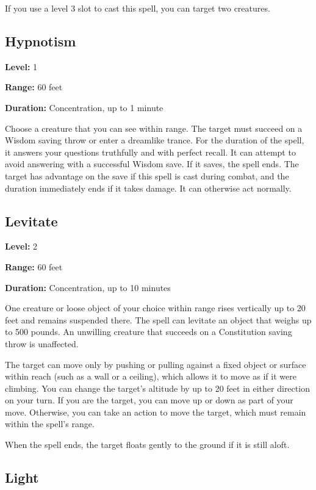 \documentclass[12pt,letterpaper,twocolumn,openany,nodeprecatedcode,bg=none]{dndbook}
\let\oldsubsection\subsection
\renewcommand{\subsection}[1]{%
  \needspace{5\baselineskip}%
  \oldsubsection{#1}%
}
\begin{document}
If you use a level 3 slot to cast this spell, you can target two
creatures.

\subsection{Hypnotism}\label{hypnotism}

\textbf{Level:} 1

\textbf{Range:} 60 feet

\textbf{Duration:} Concentration, up to 1 minute

Choose a creature that you can see within range. The target must succeed
on a Wisdom saving throw or enter a dreamlike trance. For the duration
of the spell, it answers your questions truthfully and with perfect
recall. It can attempt to avoid answering with a successful Wisdom save.
If it saves, the spell ends. The target has advantage on the save if
this spell is cast during combat, and the duration immediately ends if
it takes damage. It can otherwise act normally.

\newpage

\subsection{Levitate}\label{levitate}

\textbf{Level:} 2

\textbf{Range:} 60 feet

\textbf{Duration:} Concentration, up to 10 minutes

One creature or loose object of your choice within range rises
vertically up to 20 feet and remains suspended there. The spell can
levitate an object that weighs up to 500 pounds. An unwilling creature
that succeeds on a Constitution saving throw is unaffected.

The target can move only by pushing or pulling against a fixed object or
surface within reach (such as a wall or a ceiling), which allows it to
move as if it were climbing. You can change the target's altitude by up
to 20 feet in either direction on your turn. If you are the target, you
can move up or down as part of your move. Otherwise, you can take an
action to move the target, which must remain within the spell's range.

When the spell ends, the target floats gently to the ground if it is
still aloft.

\subsection{Light}\label{light}
\end{document}
